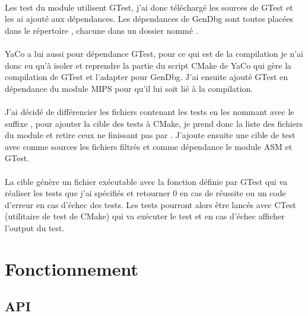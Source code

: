\documentclass[11pt, book, english, french, standardlists]{upmethodology-document}
\begin{document}
				\paragraph*{}
					Les test du module utilisent \gls{GTest}, j'ai donc téléchargé les sources de \gls{GTest}\cite{GithubGTest} et les ai ajouté aux dépendances. Les dépendances de GenDbg sont toutes placées dans le répertoire , chacune dans un dossier nommé .
				\paragraph*{}
					YaCo a lui aussi pour dépendance \gls{GTest}, pour ce qui est de la compilation je n'ai donc eu qu'à isoler et reprendre la partie du script CMake de YaCo qui gère la compilation de \gls{GTest} et l'adapter pour GenDbg. J'ai ensuite ajouté \gls{GTest} en dépendance du module \acrshort{MIPS} pour qu'il lui soit lié à la compilation.
				\paragraph*{}
					J'ai décidé de différencier les fichiers contenant les tests en les nommant avec le suffixe , pour ajouter la cible des tests à CMake, je prend donc la liste des fichiers du module et retire ceux ne finissant pas par . J'ajoute ensuite une cible de test avec comme sources les fichiers filtrés et comme dépendance le module ASM et \gls{GTest}.
				\paragraph*{}
					La cible génère un fichier exécutable avec la fonction  définie par \gls{GTest} qui va réaliser les tests que j'ai spécifiés et retourner 0 en cas de réussite ou un code d'erreur en cas d'échec des tests. Les tests pourront alors être lancés avec CTest (utilitaire de test de CMake) qui va exécuter le test et en cas d'échec afficher l'output du test.
		\section{Fonctionnement}
			\subsection{API}
\end{document}
